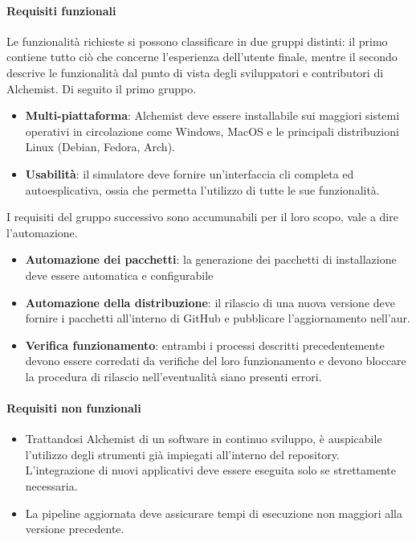 \documentclass[12pt,a4paper,openright,twoside]{book}
\begin{document}
\paragraph{Requisiti funzionali}

Le funzionalità richieste si possono classificare in due gruppi distinti: il primo contiene tutto ciò che concerne l'esperienza dell'utente finale, mentre il secondo descrive le funzionalità dal punto di vista degli sviluppatori e contributori di Alchemist. Di seguito il primo gruppo.
\begin{itemize}
	\item \textbf{Multi-piattaforma}: Alchemist deve essere installabile sui maggiori sistemi operativi in circolazione come Windows, MacOS e le principali distribuzioni Linux (Debian, Fedora, Arch).
	\item \textbf{Usabilità}: il simulatore deve fornire un'interfaccia \ac{cli} completa ed autoesplicativa, ossia che permetta l'utilizzo di tutte le sue funzionalità.
\end{itemize}

I requisiti del gruppo successivo sono accumunabili per il loro scopo, vale a dire l'automazione.

\begin{itemize}
	\item \textbf{Automazione dei pacchetti}: la generazione dei pacchetti di installazione deve essere automatica e configurabile
	\item \textbf{Automazione della distribuzione}: il rilascio di una nuova versione deve fornire i pacchetti all'interno di GitHub e pubblicare l'aggiornamento nell'\ac{aur}.
	\item \textbf{Verifica funzionamento}: entrambi i processi descritti precedentemente devono essere corredati da verifiche del loro funzionamento e devono bloccare la procedura di rilascio nell'eventualità siano presenti errori.
\end{itemize}

\paragraph{Requisiti non funzionali}

\begin{itemize}
	\item Trattandosi Alchemist di un software in continuo sviluppo, è auspicabile l'utilizzo degli strumenti già impiegati all'interno del repository. L'integrazione di nuovi applicativi deve essere eseguita solo se strettamente necessaria.
	\item La pipeline aggiornata deve assicurare tempi di esecuzione non maggiori alla versione precedente.
\end{itemize}
\end{document}
